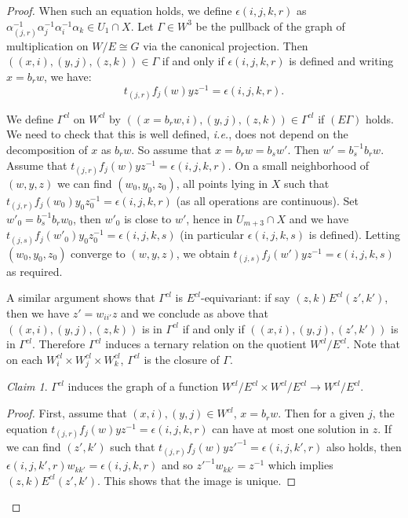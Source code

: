 \documentclass[12pt]{article}
\theoremstyle{definition}
\theoremstyle{mystyle}
\theoremstyle{remark}
\newtheorem*{claim}{Claim}
\newenvironment{claimproof}
    {\begin{proof}}{\renewcommand\qedsymbol{\Squarepipe} \end{proof}}
\begin{document}
\begin{proof}
When such an equation holds, we define $\epsilon(i,j,k,r)$ as $\alpha_{(j,r)}^{-1} \alpha_j^{-1}\alpha_i^{-1}\alpha_k\in U_1\cap X$. Let $\Gamma\in W^3$ be the pullback of the graph of multiplication on $W/E \cong G$ via the canonical projection. Then $((x,i),(y,j),(z,k))\in \Gamma$ if and only if $\epsilon(i,j,k,r)$ is defined and writing $x=b_rw$, we have:
\begin{equation}
\tag{$E\Gamma$}
t_{(j,r)} f_j(w)yz^{-1} = \epsilon(i,j,k,r).
\end{equation}

We define $\Gamma^{cl}$ on $W^{cl}$ by
$((x=b_rw,i),(y,j),(z,k))\in \Gamma^{cl}$ if $(E\Gamma)$ holds. We
need to check that this is well defined, {\it i.e.}, does not
depend on the decomposition of $x$ as $b_rw$. So assume that
$x=b_rw=b_s w'$. Then $w' = b_s^{-1} b_r w$. Assume that
$t_{(j,r)} f_j(w)yz^{-1} = \epsilon(i,j,k,r)$. On a small
neighborhood of $(w,y,z)$ we can find $(w_0,y_0,z_0)$, all points
lying in $X$ such that $t_{(j,r)}
f_j(w_0)y_0z_0^{-1}=\epsilon(i,j,k,r)$ (as all operations are
continuous). Set $w'_0 =  b_s^{-1} b_r w_0$, then $w'_0$ is close
to $w'$, hence in $U_{m+3}\cap X$ and we have $t_{(j,s)}
f_j(w'_0)y_0z_0^{-1}=\epsilon(i,j,k,s)$ (in particular
$\epsilon(i,j,k,s)$ is defined). Letting $(w_0,y_0,z_0)$ converge
to $(w,y,z)$, we obtain $t_{(j,s)}
f_j(w')yz^{-1}=\epsilon(i,j,k,s)$ as required.

A similar argument shows that $\Gamma^{cl}$ is
$E^{cl}$-equivariant: if say $(z,k)E^{cl} (z',k')$, then we have
$z'= w_{ii'}z$ and we conclude as above that $((x,i),(y,j),(z,k))$
is in $\Gamma^{cl}$ if and only if $((x,i),(y,j),(z',k'))$ is in
$\Gamma^{cl}$. Therefore $\Gamma^{cl}$ induces a ternary relation
on the quotient $W^{cl} / E^{cl}$. Note that on each
$W^{cl}_i\times W^{cl}_j \times W^{cl}_k$, $\Gamma^{cl}$ is the
closure of $\Gamma$.

\begin{claim} $\Gamma^{cl}$ induces the graph of a function $W^{cl}/E^{cl} \times W^{cl}/E^{cl}  \to W^{cl}/E^{cl}$.
\end{claim}

\begin{claimproof} First, assume that $(x,i),(y,j) \in W^{cl}$, $x=b_rw$. Then for a given $j$, the equation
$t_{(j,r)} f_j(w)yz^{-1}=\epsilon(i,j,k,r)$ can have at most one
solution in $z$. If we can find $(z',k')$ such that $t_{(j,r)}
f_j(w)yz'^{-1}=\epsilon(i,j,k',r)$ also holds, then
$\epsilon(i,j,k',r)w_{kk'}=\epsilon(i,j,k,r)$ and so
$z'^{-1}w_{kk'}=z^{-1}$ which implies $(z,k)E^{cl} (z',k')$. This
shows that the image is unique.


\end{claimproof}
\end{proof}
\end{document}
